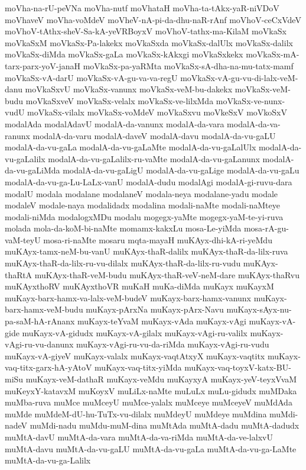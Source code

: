 {moVha-na-rU-peVNa
moVha-nutf
moVhataH
moVha-ta-tAkx-yaR-niVDoV
moVhaveV
moVha-voMdeV
moVheV-nA-pi-da-dhu-naR-rAnf
moVhoV-ceCxVdeV
moVhoV-tAthx-sheV-Sa-kA-yeVRBoyxV
moVhoV-tathx-ma-KilaM
moVkaSx
moVkaSxM
moVkaSx-Pa-lakekx
moVkaSxda
moVkaSx-dalUlx
moVkaSx-dalilx
moVkaSx-diMda
moVkaSx-gaLa
moVkaSx-kAkxgi
moVkaSxkekx
moVkaSx-mA-tarx-parx-yoV-janaH
moVkaSx-pa-yaRMta
moVkaSx-sA-dha-na-mu-tatx-mamf
moVkaSx-vA-darU
moVkaSx-vA-gu-va-va-regU
moVkaSx-vA-gu-vu-di-lalx-veM-danu
moVkaSxvU
moVkaSx-vanunx
moVkaSx-veM-bu-dakekx
moVkaSx-veM-budu
moVkaSxveV
moVkaSx-velalx
moVkaSx-ve-lilxMda
moVkaSx-ve-nunx-vudU
moVkaSx-vilalx
moVkaSx-voMdeV
moVkaSxvu
moVkeSxV
moVkoSxV
modalAda
modalAdavU
modalA-da-vanunx
modalA-da-vara
modalA-da-va-ranunx
modalA-da-varu
modalA-daveV
modalA-davu
modalA-da-vu-gaLU
modalA-da-vu-gaLa
modalA-da-vu-gaLaMte
modalA-da-vu-gaLalUlx
modalA-da-vu-gaLalilx
modalA-da-vu-gaLalilx-ru-vaMte
modalA-da-vu-gaLanunx
modalA-da-vu-gaLiMda
modalA-da-vu-gaLigU
modalA-da-vu-gaLige
modalA-da-vu-gaLu
modalA-da-vu-ga-Lu-LaLx-vanU
modalA-dudu
modalAgi
modalA-gi-ruvu-dara
modalU
modala
modalane
modalaneV
modala-neya
modalane-yadu
modale
modaleV
modale-naya
modalidadx
modalina
modali-naMte
modali-naMteye
modali-niMda
modalogxMDu
modalu
mogegx-yaMte
mogegx-yaM-te-yi-ruva
molada
mola-da-koM-bi-naMte
momamx-kakxLu
mosa-Le-yiMda
mosa-rA-gu-vaM-teyU
mosa-ri-naMte
mosaru
mqta-mayaH
muKAyx-dhi-kA-ri-yeMdu
muKAyx-tamx-neM-bu-vanU
muKAyx-thaR-dalilx
muKAyx-thaR-da-lilx-ruva
muKAyx-thaR-da-lilx-ru-vu-dilalx
muKAyx-thaR-da-lilx-ru-vudu
muKAyx-thaRtA
muKAyx-thaR-veM-budu
muKAyx-thaR-veV-neM-dare
muKAyx-thaRvu
muKAyxthoRV
muKAyxthoVR
muKaH
muKa-diMda
muKayx
muKayxM
muKayx-barx-hamx-va-lalx-veM-budeV
muKayx-barx-hamx-vanunx
muKayx-barx-hamx-veM-budu
muKayx-pArxNa
muKayx-pArx-Navu
muKayx-sAyx-nu-pa-saM-hA-rAnanx
muKayx-teYvaM
muKayx-vAda
muKayx-vAgi
muKayx-vA-gide
muKayx-vA-gidudx
muKayx-vA-gilalx
muKayx-vAgi-ru-valilx
muKayx-vAgi-ru-vu-danunx
muKayx-vAgi-ru-vu-da-riMda
muKayx-vAgi-ru-vudu
muKayx-vA-giyeV
muKayx-valalx
muKayx-vaqtAtxyX
muKayx-vaqtitx
muKayx-vaq-titx-garx-hA-yAtoV
muKayx-vaq-titx-yiMda
muKayx-vaq-toyxV-katx-BU-miSu
muKayx-veM-dathaR
muKayx-veMdu
muKayxyA
muKayx-yeV-teyxVvaM
muKeyxY-katavxM
muKoyxV
muLiLx-naMte
muLuLx
muLu-gidudx
muMDaka
muMba-ruva
muMce
muMceyU
muMce-yalalx
muMceye
muMceyeV
muMdAda
muMde
muMdeM-dU-hu-TuTx-vu-dilalx
muMdeyU
muMdeye
muMdina
muMdi-nadeV
muMdi-nadu
muMdu-muM-dina
muMtAda
muMtA-dadu
muMtA-dadudx
muMtA-davU
muMtA-da-vara
muMtA-da-va-riMda
muMtA-da-ve-lalxvU
muMtA-davu
muMtA-da-vu-gaLU
muMtA-da-vu-gaLa
muMtA-da-vu-ga-LaMte
muMtA-da-vu-ga-Lalilx
}
